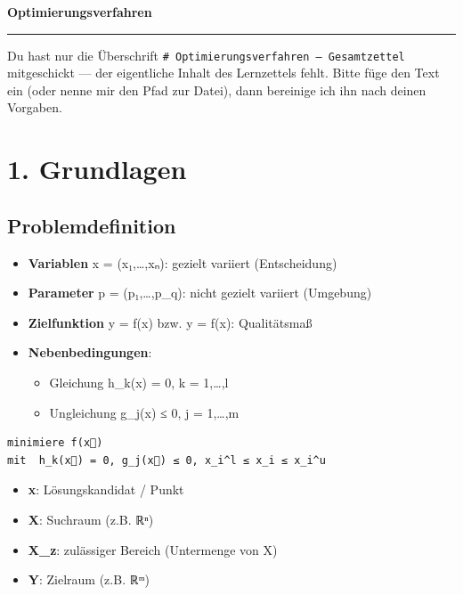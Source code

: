 \documentclass[11pt, a4paper]{article}
\providecommand{\nichttitle}{Lernzettel}
\renewcommand{\nichttitle}{Optimierungsverfahren}
\begin{document}
\begin{center}
{\bfseries\Large\color{accent}\nichttitle}\\[2pt]
\color{accent}\rule{0.35\linewidth}{1pt}\color{black}
\end{center}
\vspace{2pt}

{\small\tableofcontents}
\newpage

Du hast nur die Überschrift \texttt{\# Optimierungsverfahren – Gesamtzettel} mitgeschickt — der eigentliche Inhalt des Lernzettels fehlt. Bitte füge den Text ein (oder nenne mir den Pfad zur Datei), dann bereinige ich ihn nach deinen Vorgaben.



\section{1. Grundlagen}


\subsection{Problemdefinition}

\begin{itemize}
  \item \textbf{Variablen} x⃗ = (x₁,…,xₙ): gezielt variiert (Entscheidung)
  \item \textbf{Parameter} p⃗ = (p₁,…,p\_q): nicht gezielt variiert (Umgebung)
  \item \textbf{Zielfunktion} y = f(x⃗) bzw. y⃗ = f(x⃗): Qualitätsmaß
  \item \textbf{Nebenbedingungen}:
\begin{itemize}
  \item Gleichung h\_k(x⃗) = 0, k = 1,…,l
  \item Ungleichung g\_j(x⃗) ≤ 0, j = 1,…,m
\end{itemize}
\end{itemize}

\begin{lstlisting}
minimiere f(x⃗)
mit  h_k(x⃗) = 0, g_j(x⃗) ≤ 0, x_i^l ≤ x_i ≤ x_i^u
\end{lstlisting}


\begin{itemize}
  \item \textbf{x⃗}: Lösungskandidat / Punkt
  \item \textbf{X}: Suchraum (z.B. ℝⁿ)
  \item \textbf{X\_z}: zulässiger Bereich (Untermenge von X)
  \item \textbf{Y}: Zielraum (z.B. ℝᵐ)
\end{itemize}
\end{document}
